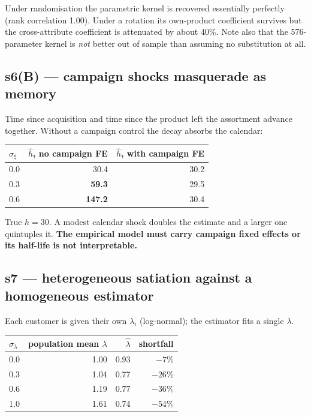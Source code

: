 \documentclass[11pt]{article}
\begin{document}
\noindent Under randomisation the parametric kernel is recovered essentially
perfectly (rank correlation 1.00). Under a rotation its own-product coefficient
survives but the cross-attribute coefficient is attenuated by about 40\%.
Note also that the 576-parameter kernel is \emph{not} better out of sample than
assuming no substitution at all.

\subsection{s6(B) --- campaign shocks masquerade as memory}

Time since acquisition and time since the product left the assortment advance
together. Without a campaign control the decay absorbs the calendar:

\begin{center}\small
\begin{tabular}{lrr}
\toprule
$\sigma_\xi$ & $\hat h$, no campaign FE & $\hat h$, with campaign FE \\
\midrule
0.0 & 30.4 & 30.2 \\
0.3 & \textbf{59.3} & 29.5 \\
0.6 & \textbf{147.2} & 30.4 \\
\bottomrule
\end{tabular}
\end{center}

\noindent True $h = 30$. A modest calendar shock doubles the estimate and a
larger one quintuples it. \textbf{The empirical model must carry campaign fixed
effects or its half-life is not interpretable.}

\subsection{s7 --- heterogeneous satiation against a homogeneous estimator}

Each customer is given their own $\lambda_i$ (log-normal); the estimator fits a
single $\lambda$.

\begin{center}\small
\begin{tabular}{lrrr}
\toprule
$\sigma_\lambda$ & population mean $\lambda$ & $\hat\lambda$ & shortfall \\
\midrule
0.0 & 1.00 & 0.93 & $-7\%$ \\
0.3 & 1.04 & 0.77 & $-26\%$ \\
0.6 & 1.19 & 0.77 & $-36\%$ \\
1.0 & 1.61 & 0.74 & $-54\%$ \\
\bottomrule
\end{tabular}
\end{center}
\end{document}
